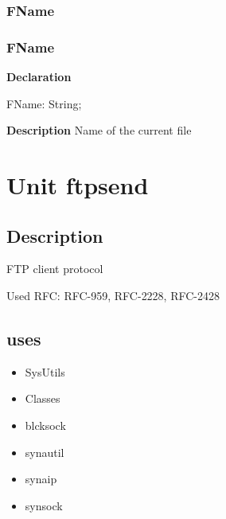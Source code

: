 \documentclass{report}
\newif\ifpdf
\begin{document}
\subsection*{\large{\textbf{FName}}\normalsize\hspace{1ex}\hrulefill}
\else
\subsection*{FName}
\fi
\label{editor-FName}
\begin{list}{}{
\setlength{\itemindent}{0cm}
\setlength{\listparindent}{0cm}
\setlength{\leftmargin}{\evensidemargin}
\addtolength{\leftmargin}{\tmplength}
\settowidth{\labelsep}{X}
\addtolength{\leftmargin}{\labelsep}
\setlength{\labelwidth}{\tmplength}
}
\item[\textbf{Declaration}\hfill]
\ifpdf
\begin{flushleft}
\fi
\begin{ttfamily}
FName: String;\end{ttfamily}

\ifpdf
\end{flushleft}
\fi

\par
\item[\textbf{Description}]
Name of the current file

\end{list}
\chapter{Unit ftpsend}
\label{ftpsend}
\section{Description}
FTP client protocol\hfill\vspace*{1ex}



Used RFC: RFC{-}959, RFC{-}2228, RFC{-}2428
\section{uses}
\begin{itemize}
\item \begin{ttfamily}SysUtils\end{ttfamily}\item \begin{ttfamily}Classes\end{ttfamily}\item \begin{ttfamily}blcksock\end{ttfamily}\item \begin{ttfamily}synautil\end{ttfamily}\item \begin{ttfamily}synaip\end{ttfamily}\item \begin{ttfamily}synsock\end{ttfamily}\end{itemize}
\end{document}
